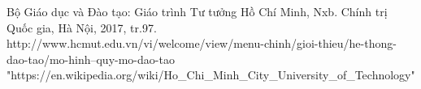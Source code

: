 \begin{thebibliography}{9}
Bộ Giáo dục và Đào tạo: Giáo trình Tư tưởng Hồ Chí Minh, Nxb. Chính trị Quốc gia, Hà Nội, 2017, tr.97.
http://www.hcmut.edu.vn/vi/welcome/view/menu-chinh/gioi-thieu/he-thong-dao-tao/mo-hinh--quy-mo-dao-tao
"https://en.wikipedia.org/wiki/Ho\_Chi\_Minh\_City\_University\_of\_Technology"
\end{thebibliography}


